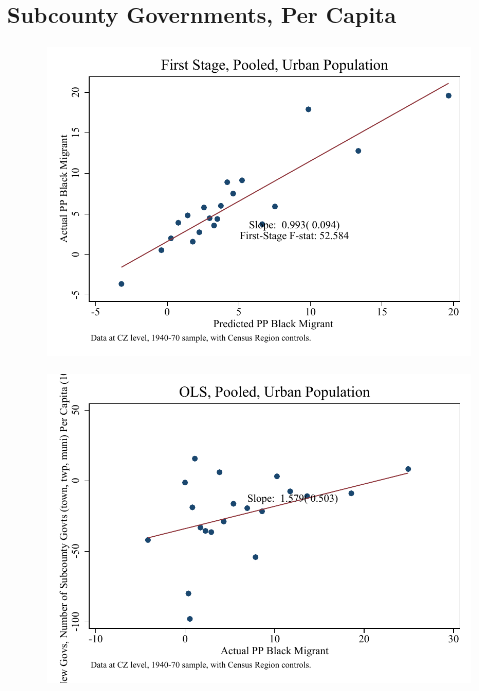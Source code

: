 \documentclass{article}
\begin{document}
\subsection{Subcounty Governments, Per Capita}

\clearpage
\begin{figure}
\centering
\includegraphics{figures/simplefigs/pooled_gen_subcounty_pc_C3_urban_fs.pdf}
\end{figure}
\clearpage
\begin{figure}
\centering
\includegraphics{figures/simplefigs/pooled_gen_subcounty_pc_C3_urban_ols.pdf}
\end{figure}
\clearpage
\end{document}
